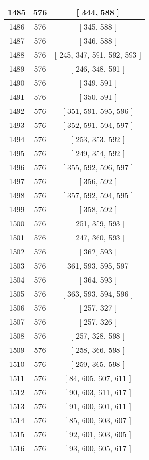\begin{center}
\begin{longtable}[H]{|| c c c ||}
1485 & 576 & [ 344, 588 ] \\ 
\hline
1486 & 576 & [ 345, 588 ] \\ 
\hline
1487 & 576 & [ 346, 588 ] \\ 
\hline
1488 & 576 & [ 245, 347, 591, 592, 593 ] \\ 
\hline
1489 & 576 & [ 246, 348, 591 ] \\ 
\hline
1490 & 576 & [ 349, 591 ] \\ 
\hline
1491 & 576 & [ 350, 591 ] \\ 
\hline
1492 & 576 & [ 351, 591, 595, 596 ] \\ 
\hline
1493 & 576 & [ 352, 591, 594, 597 ] \\ 
\hline
1494 & 576 & [ 253, 353, 592 ] \\ 
\hline
1495 & 576 & [ 249, 354, 592 ] \\ 
\hline
1496 & 576 & [ 355, 592, 596, 597 ] \\ 
\hline
1497 & 576 & [ 356, 592 ] \\ 
\hline
1498 & 576 & [ 357, 592, 594, 595 ] \\ 
\hline
1499 & 576 & [ 358, 592 ] \\ 
\hline
1500 & 576 & [ 251, 359, 593 ] \\ 
\hline
1501 & 576 & [ 247, 360, 593 ] \\ 
\hline
1502 & 576 & [ 362, 593 ] \\ 
\hline
1503 & 576 & [ 361, 593, 595, 597 ] \\ 
\hline
1504 & 576 & [ 364, 593 ] \\ 
\hline
1505 & 576 & [ 363, 593, 594, 596 ] \\ 
\hline
1506 & 576 & [ 257, 327 ] \\ 
\hline
1507 & 576 & [ 257, 326 ] \\ 
\hline
1508 & 576 & [ 257, 328, 598 ] \\ 
\hline
1509 & 576 & [ 258, 366, 598 ] \\ 
\hline
1510 & 576 & [ 259, 365, 598 ] \\ 
\hline
1511 & 576 & [ 84, 605, 607, 611 ] \\ 
\hline
1512 & 576 & [ 90, 603, 611, 617 ] \\ 
\hline
1513 & 576 & [ 91, 600, 601, 611 ] \\ 
\hline
1514 & 576 & [ 85, 600, 603, 607 ] \\ 
\hline
1515 & 576 & [ 92, 601, 603, 605 ] \\ 
\hline
1516 & 576 & [ 93, 600, 605, 617 ] \\ 

\end{longtable}
\end{center}
